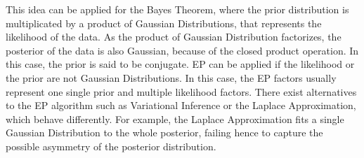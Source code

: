 \documentclass[review,preprint,12pt]{elsarticle}
\begin{document}
This idea can be applied for the Bayes Theorem, where the prior distribution is multiplicated by a product of Gaussian Distributions, that represents the likelihood of the data. As the product of Gaussian Distribution factorizes, the posterior of the data is also Gaussian, because of the closed product operation. In this case, the prior is said to be conjugate. EP can be applied if the likelihood or the prior are not Gaussian Distributions. In this case, the EP factors usually represent one single prior and multiple likelihood factors. There exist alternatives to the EP algorithm such as Variational Inference or the Laplace Approximation, which behave differently. For example, the Laplace Approximation fits a single Gaussian Distribution to the whole posterior, failing hence to capture the possible asymmetry of the posterior distribution.
\end{document}
